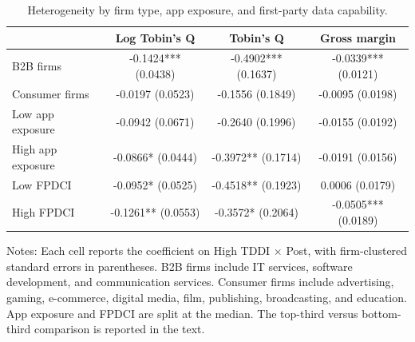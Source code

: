 \begin{table}[htbp]
\centering
\small
\caption{Heterogeneity by firm type, app exposure, and first-party data capability.}
\label{tab:hetero}
\begin{threeparttable}
\begin{tabular}{lccc}
\toprule
 & Log Tobin's Q & Tobin's Q & Gross margin \\
\midrule
B2B firms & -0.1424*** (0.0438) & -0.4902*** (0.1637) & -0.0339*** (0.0121) \\
Consumer firms & -0.0197 (0.0523) & -0.1556 (0.1849) & -0.0095 (0.0198) \\
Low app exposure & -0.0942 (0.0671) & -0.2640 (0.1996) & -0.0155 (0.0192) \\
High app exposure & -0.0866* (0.0444) & -0.3972** (0.1714) & -0.0191 (0.0156) \\
Low FPDCI & -0.0952* (0.0525) & -0.4518** (0.1923) & 0.0006 (0.0179) \\
High FPDCI & -0.1261** (0.0553) & -0.3572* (0.2064) & -0.0505*** (0.0189) \\
\bottomrule
\end{tabular}
\begin{tablenotes}[flushleft]
\footnotesize
\item Notes: Each cell reports the coefficient on High TDDI $\times$ Post, with firm-clustered standard errors in parentheses. B2B firms include IT services, software development, and communication services. Consumer firms include advertising, gaming, e-commerce, digital media, film, publishing, broadcasting, and education. App exposure and FPDCI are split at the median. The top-third versus bottom-third comparison is reported in the text.
\end{tablenotes}
\end{threeparttable}
\end{table}
